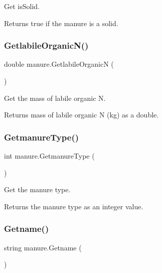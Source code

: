 Get is\+Solid. 

\begin{DoxyReturn}{Returns}
true if the manure is a solid. 
\end{DoxyReturn}
\mbox{\label{classmanure_a0bbdefcebb7c190928cb33020f90bd39}} 
\subsubsection{\texorpdfstring{GetlabileOrganicN()}{GetlabileOrganicN()}}
{\footnotesize\ttfamily double manure.\+Getlabile\+OrganicN (\begin{DoxyParamCaption}{ }\end{DoxyParamCaption})\hspace{0.3cm}{\ttfamily [inline]}}



Get the mass of labile organic N. 

\begin{DoxyReturn}{Returns}
mass of labile organic N (kg) as a double. 
\end{DoxyReturn}
\mbox{\label{classmanure_ad1c01d702d92e6863874aeb5868a01b4}} 
\subsubsection{\texorpdfstring{GetmanureType()}{GetmanureType()}}
{\footnotesize\ttfamily int manure.\+Getmanure\+Type (\begin{DoxyParamCaption}{ }\end{DoxyParamCaption})\hspace{0.3cm}{\ttfamily [inline]}}



Get the manure type. 

\begin{DoxyReturn}{Returns}
the manure type as an integer value. 
\end{DoxyReturn}
\mbox{\label{classmanure_a128dec8040ac78a9b969c060d9732317}} 
\subsubsection{\texorpdfstring{Getname()}{Getname()}}
{\footnotesize\ttfamily string manure.\+Getname (\begin{DoxyParamCaption}{ }\end{DoxyParamCaption})\hspace{0.3cm}{\ttfamily [inline]}}



